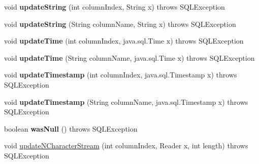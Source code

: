 \begin{DoxyCompactItemize}
\mbox{\label{classcom_1_1mysql_1_1cj_1_1jdbc_1_1result_1_1_result_set_impl_ac7acb97fae07a54c1ea0b7f00771bacf}} 
void {\bfseries update\+String} (int column\+Index, String x)  throws S\+Q\+L\+Exception 
\item 
\mbox{\label{classcom_1_1mysql_1_1cj_1_1jdbc_1_1result_1_1_result_set_impl_a79430168874e9e7f24ccc9aa88da1dca}} 
void {\bfseries update\+String} (String column\+Name, String x)  throws S\+Q\+L\+Exception 
\item 
\mbox{\label{classcom_1_1mysql_1_1cj_1_1jdbc_1_1result_1_1_result_set_impl_afe7d6a52596562d5b96b53e8bc40d262}} 
void {\bfseries update\+Time} (int column\+Index, java.\+sql.\+Time x)  throws S\+Q\+L\+Exception 
\item 
\mbox{\label{classcom_1_1mysql_1_1cj_1_1jdbc_1_1result_1_1_result_set_impl_a7de415573417c0773b21eab859ce5018}} 
void {\bfseries update\+Time} (String column\+Name, java.\+sql.\+Time x)  throws S\+Q\+L\+Exception 
\item 
\mbox{\label{classcom_1_1mysql_1_1cj_1_1jdbc_1_1result_1_1_result_set_impl_afa5a174ab3e6d4b9e103d6d826c15c75}} 
void {\bfseries update\+Timestamp} (int column\+Index, java.\+sql.\+Timestamp x)  throws S\+Q\+L\+Exception 
\item 
\mbox{\label{classcom_1_1mysql_1_1cj_1_1jdbc_1_1result_1_1_result_set_impl_ac86c897d9f1641b3985981ad38f0230d}} 
void {\bfseries update\+Timestamp} (String column\+Name, java.\+sql.\+Timestamp x)  throws S\+Q\+L\+Exception 
\item 
\mbox{\label{classcom_1_1mysql_1_1cj_1_1jdbc_1_1result_1_1_result_set_impl_ab1ba92f109b4c15cb3de8ed30b193ff2}} 
boolean {\bfseries was\+Null} ()  throws S\+Q\+L\+Exception 
\item 
void \mbox{\hyperlink{classcom_1_1mysql_1_1cj_1_1jdbc_1_1result_1_1_result_set_impl_a3326425b4127583b88d1d7806166b9af}{update\+N\+Character\+Stream}} (int column\+Index, Reader x, int length)  throws S\+Q\+L\+Exception 

\end{DoxyCompactItemize}
